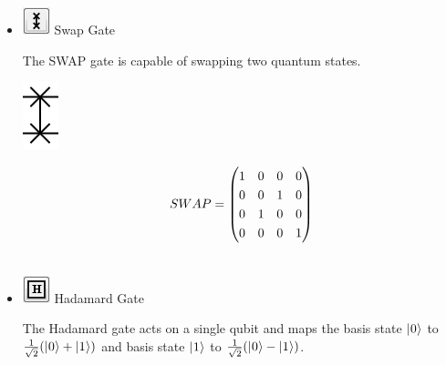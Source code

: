 \documentclass[10pt]{article}
\theoremstyle{definition}
\newcommand{\microspace}{\mspace{0.5mu}}
\def \lket {\left|}
\def \rket {\right\rangle}
\newcommand{\ket}[1]{\lket\microspace #1 \microspace\rket}
\begin{document}
\begin{itemize}
\item \includegraphics{Figures/Gates/SwapGate.png}  Swap Gate

The SWAP gate is capable of swapping two quantum states.

\begin{center}
\includegraphics[scale=.7]{Figures/Gates/SwapGateViewer} \\
  \begin{minipage}{.9\linewidth}
    \begin{equation*} \label{mat:Swap}
    \renewcommand{\arraystretch}{1.25}
SWAP = \begin{pmatrix} 1 & 0 & 0 & 0 \\ 0 & 0 & 1 & 0 \\ 0 & 1 & 0 & 0 \\ 0 & 0 & 0 & 1\end{pmatrix}
    \end{equation*}
  \end{minipage}\hspace{-2.5cm}
  \begin{minipage}{.2\linewidth}
  \vspace*{3pt}
    \begin{align}
    \end{align}
  \end{minipage}
\end{center}

\item \includegraphics{Figures/Gates/Hadamard.png}  Hadamard Gate

The Hadamard gate acts on a single qubit and maps the basis state $\ket{0}$ to $\frac{1}{\sqrt 2}(\ket{0} + \ket{1})$ and basis state $\ket{1}$ to $\frac{1}{\sqrt 2}(\ket{0} - \ket{1})$. 


\end{itemize}
\end{document}
